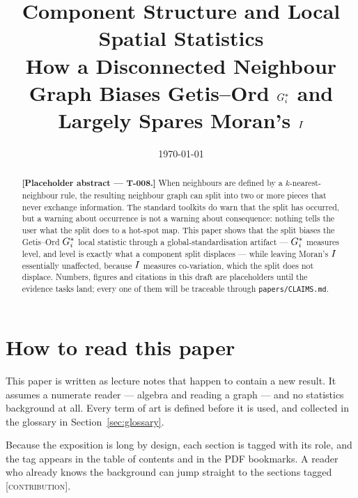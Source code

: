 \documentclass[11pt,a4paper]{article}
\title{Component Structure and Local Spatial Statistics\\[0.3em]
  \large How a Disconnected Neighbour Graph Biases Getis--Ord $G_i^{*}$
  and Largely Spares Moran's $I$}
\author{\paperauthor}
\date{\today}
\begin{document}
\maketitle

\begin{abstract}
\noindent
\textbf{[Placeholder abstract --- T-008.]}
When neighbours are defined by a $k$-nearest-neighbour rule, the resulting
neighbour graph can split into two or more pieces that never exchange
information. The standard toolkits do warn that the split has occurred, but a
warning about occurrence is not a warning about consequence: nothing tells the
user what the split does to a hot-spot map. This paper
shows that the split biases the Getis--Ord $G_i^{*}$ local statistic through a
global-standardisation artifact --- $G_i^{*}$ measures level, and level is
exactly what a component split displaces --- while leaving Moran's $I$
essentially unaffected, because $I$ measures co-variation, which the split
does not displace. Numbers, figures and citations in this draft are placeholders
until the evidence tasks land; every one of them will be traceable through
\texttt{papers/CLAIMS.md}.
\end{abstract}

\tableofcontents
\bigskip

\section{How to read this paper}
\label{sec:roadmap}

This paper is written as lecture notes that happen to contain a new result. It
assumes a numerate reader --- algebra and reading a graph --- and no statistics
background at all. Every term of art is defined before it is used, and collected
in the glossary in Section~\ref{sec:glossary}.

Because the exposition is long by design, each section is tagged with its role,
and the tag appears in the table of contents and in the PDF bookmarks. A reader
who already knows the background can jump straight to the sections tagged
\textsc{[contribution]}.
\end{document}

